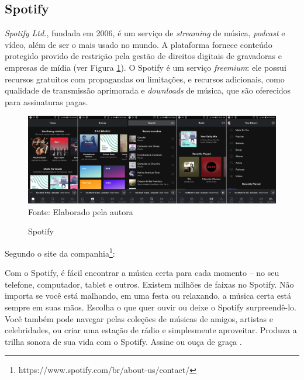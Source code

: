 \subsection{Spotify} \label{subsec:spotify}
\textit{Spotify Ltd.}, fundada em 2006, é um serviço de \textit{streaming} de música, \textit{podcast} e vídeo, além de ser o mais usado no mundo. A plataforma fornece conteúdo protegido provido de restrição pela gestão de direitos digitais de gravadoras e empresas de mídia (ver Figura \ref{fig:spotify}). O Spotify é um serviço \textit{freemium}: ele possui recursos gratuitos com propagandas ou limitações, e recursos adicionais, como qualidade de transmissão aprimorada e \textit{downloads} de música, que são oferecidos para assinaturas pagas.

\begin{figure}[!htb]
   \centering
   \caption{Spotify}\label{fig:spotify} 
   \includegraphics[scale=0.10]{figuras/spotify.jpg}
   \\Fonte: Elaborado pela autora
\end{figure}

Segundo o site da companhia\footnote{https://www.spotify.com/br/about-us/contact/}:

\begin{citacao}
Com o Spotify, é fácil encontrar a música certa para cada momento – no seu telefone, computador, tablet e outros. Existem milhões de faixas no Spotify. Não importa se você está malhando, em uma festa ou relaxando, a música certa está sempre em suas mãos. Escolha o que quer ouvir ou deixe o Spotify surpreendê-lo. Você também pode navegar pelas coleções de músicas de amigos, artistas e celebridades, ou criar uma estação de rádio e simplesmente aproveitar. Produza a trilha sonora de sua vida com o Spotify. Assine ou ouça de graça \cite{spotify2006}.
\end{citacao}

